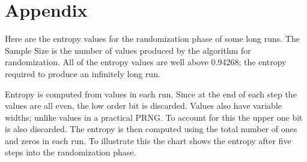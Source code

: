 \documentclass[letterpaper]{article}
\begin{document}
\begin{multicols}{2}
\end{multicols}

\appendix

\section*{Appendix}

Here are the entropy values for the randomization phase of some long runs. The Sample Size is the number of values produced by the algorithm for randomization. All of the entropy values are well above 0.94268; the entropy required to produce an infinitely long run.

Entropy is computed from values in each run. Since at the end of each step the values are all even, the low order bit is discarded. Values also have variable widths; unlike values in a practical PRNG. To account for this the upper one bit is also discarded. The entropy is then computed using the total number of ones and zeros in each run. To illustrate this the chart shows the entropy after five steps into the randomization phase.
\end{document}
